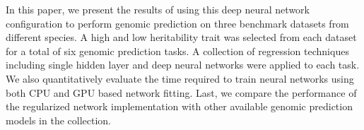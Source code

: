 In this paper, we present the results of using this deep neural network
configuration to perform genomic prediction on three benchmark datasets 
from different species. A high and low heritability trait was selected 
from each dataset for a total of six genomic prediction tasks. A collection 
of regression techniques including single hidden layer and deep neural networks were 
applied to each task. We also quantitatively evaluate the 
time required to train neural networks using both CPU and GPU based 
network fitting. Last, we compare the performance of the regularized network
implementation with other available genomic prediction models in the collection.


